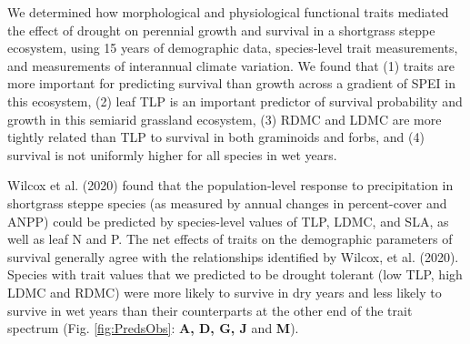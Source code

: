 \documentclass[12pt, letterpaper]{article}
\begin{document}
We determined how morphological and physiological functional traits mediated the effect of drought on perennial growth and survival in a shortgrass steppe ecosystem, using 15 years of demographic data, species-level trait measurements, and measurements of interannual climate variation. We found that (1) traits are more important for predicting survival than growth across a gradient of SPEI in this ecosystem, (2) leaf TLP is an important predictor of survival probability and growth in this semiarid grassland ecosystem, (3) RDMC and LDMC are more tightly related than TLP to survival in both graminoids and forbs, and (4) survival is not uniformly higher for all species in wet years.

Wilcox et al. (2020) found that the population-level response to precipitation in shortgrass steppe species (as measured by annual changes in percent-cover and ANPP) could be predicted by species-level values of TLP, LDMC, and SLA, as well as leaf N and P. The net effects of traits on the demographic parameters of survival generally agree with the relationships identified by Wilcox, et al. (2020). Species with trait values that we predicted to be drought tolerant (low TLP, high LDMC and RDMC) were more likely to survive in dry years and less likely to survive in wet years than their counterparts at the other end of the trait spectrum (Fig. \ref{fig:PredsObs}: \textbf{A, D, G, J} and \textbf{M}).
\end{document}
